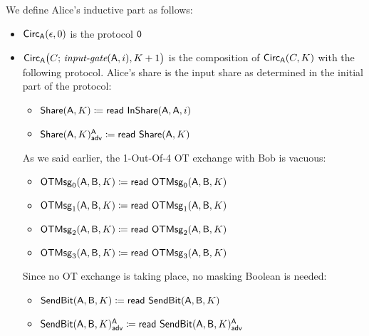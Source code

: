 \noindent We define Alice's inductive part as follows:
 
\begin{itemize}
\item $\Circ_\A(\epsilon,0)$ is the protocol $\zero$

\item $\Circ_\A\big(C; \, \inputgate(\A,i),K+1\big)$ is the composition of $\Circ_\A(C,K)$ with the following protocol. Alice's share is the input share as determined in the initial part of the protocol:
\begin{itemize}
\item $\Share(\A,K) \coloneqq \read{\InShare(\A,\A,i)}$
\item {\color{blue} $\LeakShare(\A,K)^\A_\adv \coloneqq \read{\Share(\A,K)}$}
\end{itemize}
As we said earlier, the 1-Out-Of-4 OT exchange with Bob is vacuous:
\begin{itemize}
\item $\OTMsg_0(\A,\B,K) \coloneqq \read{\OTMsg_0(\A,\B,K)}$
\item $\OTMsg_1(\A,\B,K) \coloneqq \read{\OTMsg_1(\A,\B,K)}$
\item $\OTMsg_2(\A,\B,K) \coloneqq \read{\OTMsg_2(\A,\B,K)}$
\item $\OTMsg_3(\A,\B,K) \coloneqq \read{\OTMsg_3(\A,\B,K)}$
\end{itemize}
Since no OT exchange is taking place, no masking Boolean is needed:
\begin{itemize}
\item $\SendBit(\A,\B,K) \coloneqq \read{\SendBit(\A,\B,K)}$
\item {\color{blue} $\LeakSendBit(\A,\B,K)^\A_\adv \coloneqq \read{\LeakSendBit(\A,\B,K)^\A_\adv}$}
\end{itemize}


\end{itemize}
